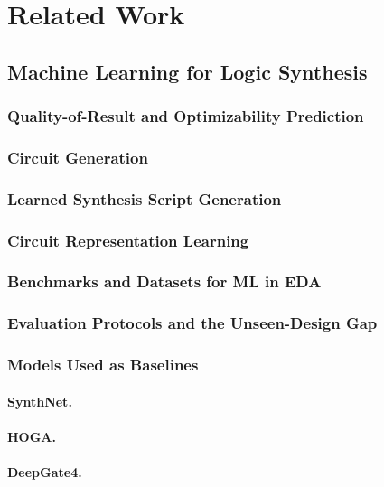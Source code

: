 \section{Related Work}
\label{sec:relwork}

\subsection{Machine Learning for Logic Synthesis}
\label{sec:relwork:ml4eda}

\subsubsection{Quality-of-Result and Optimizability Prediction}
\label{sec:relwork:ml4eda:qor}

\subsubsection{Circuit Generation}
\label{sec:relwork:ml4eda:generation}

\subsubsection{Learned Synthesis Script Generation}
\label{sec:relwork:ml4eda:scripts}

\subsubsection{Circuit Representation Learning}
\label{sec:relwork:ml4eda:representation}

\subsubsection{Benchmarks and Datasets for ML in EDA}
\label{sec:relwork:ml4eda:datasets}

\subsubsection{Evaluation Protocols and the Unseen-Design Gap}
\label{sec:relwork:ml4eda:protocols}

\subsubsection{Models Used as Baselines}
\label{sec:relwork:ml4eda:baselines}

\paragraph{SynthNet.}

\paragraph{HOGA.}

\paragraph{DeepGate4.}
